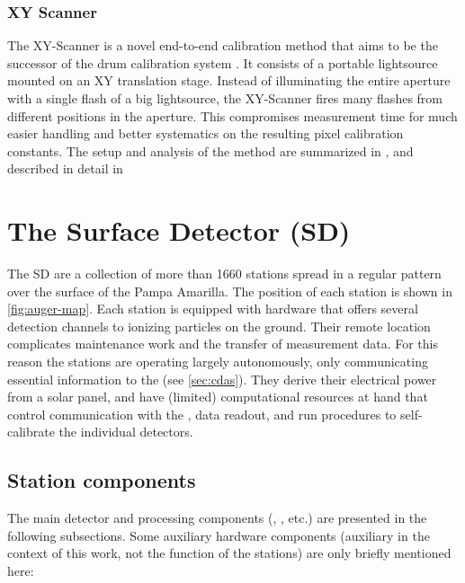 \subsubsection{XY Scanner}

The XY-Scanner is a novel end-to-end calibration method that aims to be the
successor of the drum calibration system \cite{engelNewEndtoendCalibration2017}.
It consists of a portable \IS lightsource mounted on an XY translation stage. 
Instead of illuminating the entire aperture with a single flash of a big 
lightsource, the XY-Scanner fires many flashes from different positions in the 
aperture. This compromises measurement time for much easier handling and better
systematics on the resulting pixel calibration constants. The setup and analysis
of the method are summarized in , and described in
detail in \cite{schaferXYScannerVersatileMethod2023}

\section{The Surface Detector (SD)}
\label{sec:sd}

The \acf{SD} are a collection of more than 1660 stations spread in a regular 
pattern over the surface of the Pampa Amarilla. The position of each station is 
shown in \cref{fig:auger-map}. Each station is equipped with hardware that 
offers several detection channels to ionizing particles on the ground. Their 
remote location complicates maintenance work and the transfer of measurement 
data. For this reason the stations are operating largely autonomously, only 
communicating essential information to the \CDAS (see \cref{sec:cdas}). They 
derive their electrical power from a solar panel, and have (limited) 
computational resources at hand that control communication with the \CDAS, data 
readout, and run procedures to self-calibrate the individual detectors. 

\subsection{Station components}
\label{ssec:station-components}

The main detector and processing components (\WCD, \UUB, etc.) are presented in
the following subsections. Some auxiliary hardware components (auxiliary in the 
context of this work, not the function of the stations) are only briefly 
mentioned here:

